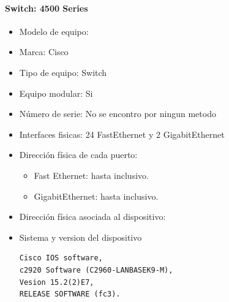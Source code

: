 \paragraph{Switch: 4500 Series}
\begin{itemize}
  \item Modelo de equipo: 
  \item Marca: Cisco
  \item Tipo de equipo: Switch
  \item Equipo modular: Si
  \item Número de serie: No se encontro por ningun metodo
  \item Interfaces fisicas:  24 FastEthernet y 2 GigabitEthernet
  \item Dirección física de cada puerto:
    \begin{itemize}
      \item Fast Ethernet:  hasta  inclusivo.
      \item GigabitEthernet:  hasta  inclusivo.
    \end{itemize}
  \item Dirección física asociada al dispositivo: 
  \item Sistema y version del dispositivo
    \begin{verbatim}
Cisco IOS software, 
c2920 Software (C2960-LANBASEK9-M), 
Vesion 15.2(2)E7, 
RELEASE SOFTWARE (fc3).
    \end{verbatim}
\end{itemize}

